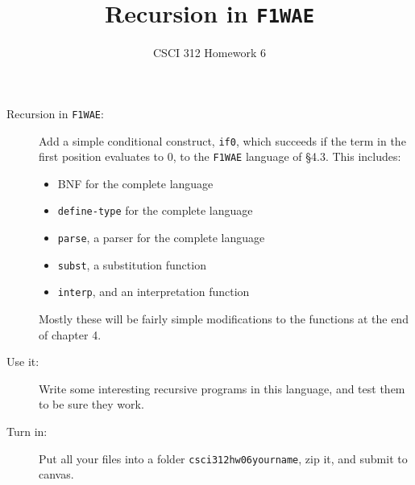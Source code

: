 \documentclass[12pt]{article}
\author{CSCI 312 Homework 6}
\title{Recursion in {\tt F1WAE}}
\begin{document}
\maketitle

\begin{description}

\item[Recursion in {\tt F1WAE}:] Add a simple conditional
construct, {\tt if0}, which succeeds if the term in the first position
evaluates to 0, to the {\tt F1WAE} language of \S 4.3.  This includes:
\begin{itemize}
\item BNF for the complete language
\item {\tt define-type} for the complete language
\item {\tt parse},  a parser for the complete language
\item {\tt subst}, a substitution function 
\item {\tt interp}, and an interpretation function\
\end{itemize}
Mostly these will be fairly simple modifications to the functions
at the end of chapter 4.

\item[Use it:]  Write some interesting recursive programs in this language,
and test them to be sure they work.

\item[Turn in:] Put all your files into a folder {\tt csci312hw06yourname},
zip it, and submit to canvas.


\end{description}
\end{document}
